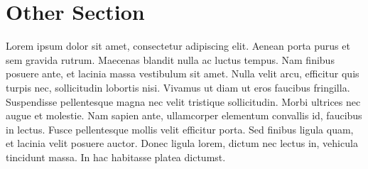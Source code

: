 \documentclass{article}
\begin{document}

\section{Other Section}

Lorem ipsum dolor sit amet, consectetur adipiscing elit.
Aenean porta purus et sem gravida rutrum.
Maecenas blandit nulla ac luctus tempus.
Nam finibus posuere ante, et lacinia massa vestibulum sit amet.
Nulla velit arcu, efficitur quis turpis nec, sollicitudin lobortis nisi.
Vivamus ut diam ut eros faucibus fringilla.
Suspendisse pellentesque magna nec velit tristique sollicitudin.
Morbi ultrices nec augue et molestie.
Nam sapien ante, ullamcorper elementum convallis id, faucibus in lectus.
Fusce pellentesque mollis velit efficitur porta.
Sed finibus ligula quam, et lacinia velit posuere auctor.
Donec ligula lorem, dictum nec lectus in, vehicula tincidunt massa.
In hac habitasse platea dictumst.


\printbibliography[heading=bibintoc]

\end{document}
